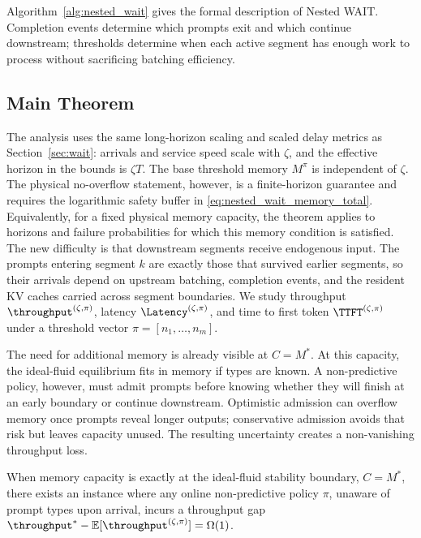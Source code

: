 Algorithm~\ref{alg:nested_wait} gives the formal description of Nested WAIT. Completion events determine which prompts exit and which continue downstream; thresholds determine when each active segment has enough work to process without sacrificing batching efficiency.

\subsection{Main Theorem}
\label{subsec:nested_main_theorem}

The analysis uses the same long-horizon scaling and scaled delay metrics as Section~\ref{sec:wait}: arrivals and service speed scale with \(\zeta\), and the effective horizon in the bounds is \(\zeta T\). The base threshold memory \(M^\pi\) is independent of \(\zeta\). The physical no-overflow statement, however, is a finite-horizon guarantee and requires the logarithmic safety buffer in \eqref{eq:nested_wait_memory_total}. Equivalently, for a fixed physical memory capacity, the theorem applies to horizons and failure probabilities for which this memory condition is satisfied. The new difficulty is that downstream segments receive endogenous input. The prompts entering segment \(k\) are exactly those that survived earlier segments, so their arrivals depend on upstream batching, completion events, and the resident KV caches carried across segment boundaries. We study throughput \(\throughput^{(\zeta,\pi)}\), latency \(\Latency^{(\zeta,\pi)}\), and time to first token \(\TTFT^{(\zeta,\pi)}\) under a threshold vector \(\pi=[n_1,\dots,n_m]\).

The need for additional memory is already visible at \(C=M^*\). At this capacity, the ideal-fluid equilibrium fits in memory if types are known. A non-predictive policy, however, must admit prompts before knowing whether they will finish at an early boundary or continue downstream. Optimistic admission can overflow memory once prompts reveal longer outputs; conservative admission avoids that risk but leaves capacity unused. The resulting uncertainty creates a non-vanishing throughput loss.

\begin{proposition}
\label{prop:unknown_lower_bound}
When memory capacity is exactly at the ideal-fluid stability boundary, \(C=M^*\), there exists an instance where any online non-predictive policy \( \pi \), unaware of prompt types upon arrival, incurs a throughput gap \( \throughput^* - \mathbb{E}[\throughput^{(\zeta, \pi)}] = \Omega(1) \).
\end{proposition}

